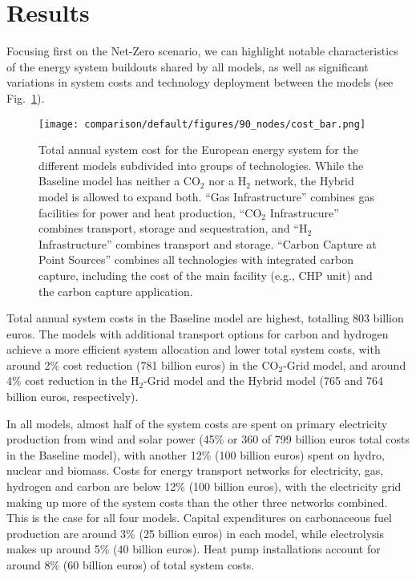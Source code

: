 \documentclass[twocolumn]{article}
\newcommand{\carbon}{CO$_2$}
\newcommand{\hydrogen}{H$_2$}
\newcommand{\modBase}{Baseline model}
\newcommand{\modCO}{CO$_2$-Grid model}
\newcommand{\modH}{H$_2$-Grid model}
\newcommand{\modHybrid}{Hybrid model}
\begin{document}
\section{Results}
\label{sec:results}


Focusing first on the Net-Zero scenario, we can highlight notable characteristics of the energy system buildouts shared by all models, as well as significant variations in system costs and technology deployment between the models (see Fig.~\ref{fig:cost_bar}).

\begin{figure}[ht!]
    \centering
    \texttt{[image: comparison/default/figures/90\_nodes/cost\_bar.png]}
    \caption[short]{Total annual system cost for the European energy system for the different models subdivided into groups of technologies. While the Baseline model has neither a \carbon{} nor a \hydrogen{} network, the Hybrid model is allowed to expand both. ``Gas Infrastructure'' combines gas facilities for power and heat production, ``\carbon{} Infrastrucure'' combines transport, storage and sequestration, and ``H$_2$ Infrastructure'' combines transport and storage. ``Carbon Capture at Point Sources'' combines all technologies with integrated carbon capture, including the cost of the main facility (e.g., CHP unit) and the carbon capture application.}
    \label{fig:cost_bar}
\end{figure}

Total annual system costs in the \modBase{} are highest, totalling \label{}803 billion euros. The models with additional transport options for carbon and hydrogen achieve a more efficient system allocation and lower total system costs, with around \label{}2\% cost reduction (\label{}781 billion euros) in the \modCO{}, and around \label{}4\% cost reduction in the \modH{} and the \modHybrid{} (\label{}765 and \label{}764 billion euros, respectively).

In all models, almost half of the system costs are spent on primary electricity production from wind and solar power (\label{}45\% or \label{}360 of \label{}799 billion euros total costs in the Baseline model), with another \label{}12\% (\label{}100 billion euros) spent on hydro, nuclear and biomass. Costs for energy transport networks for electricity, gas, hydrogen and carbon are below \label{}12\% (\label{}100 billion euros), with the electricity grid making up more of the system costs than the other three networks combined. This is the case for all four models. Capital expenditures on carbonaceous fuel production are around \label{}3\% (\label{}25 billion euros) in each model, while electrolysis makes up around \label{}5\% (\label{}40 billion euros). Heat pump installations account for around \label{}8\% (60 billion euros) of total system costs.
\end{document}
